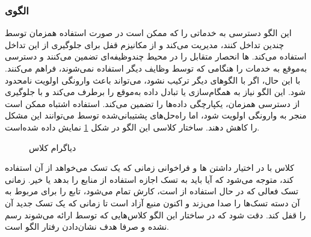 \subsubsection{الگوی }
\label{scheduleGuardedCallSec}
\begin{RTL}
این الگو \cite{ref1} دسترسی به خدماتی را که ممکن است
در صورت استفاده همزمان توسط چندین  تداخل کنند، مدیریت می‌کند و از مکانیزم قفل
برای جلوگیری از این تداخل استفاده می‌کند. ها انحصار متقابل
را در محیط چندوظیفه‌ای تضمین می‌کنند و دسترسی به‌موقع به خدمات را هنگامی
که توسط وظایف دیگر استفاده نمی‌شوند، فراهم می‌کنند. با این حال،
اگر با الگوهای دیگر ترکیب نشود، می‌تواند باعث وارونگی اولویت نامحدود شود.
این الگو نیاز به همگام‌سازی یا تبادل داده به‌موقع را برطرف می‌کند و
با جلوگیری از دسترسی همزمان، یکپارچگی داده‌ها را تضمین
می‌کند. استفاده اشتباه ممکن است منجر به وارونگی اولویت شود، اما
راه‌حل‌های پشتیبانی‌شده توسط  می‌توانند این مشکل را کاهش دهند.
ساختار کلاسی این الگو در شکل \ref{ConGuardCallClassDiag}
نمایش داده شده‌است.
\end{RTL}
\begin{figure}[h!]
\centering
{}
\caption{دیاگرام کلاس }
\label{ConGuardCallClassDiag}
\end{figure}
\begin{RTL}
کلاس  با در اختیار داشتن ها
و فراخوانی  زمانی که یک تسک می‌خواهد از آن استفاده کند،
متوجه می‌شود که آیا باید به تسک اجازه استفاده از منابع را بدهد یا خیر.
زمانی تسک فعالی که در حال استفاده از  است،
کارش تمام می‌شود،  تابع  را
برای  مربوط به آن دسته تسک‌ها را صدا می‌زند و اکنون
منبع آزاد است تا زمانی که یک تسک جدید آن را قفل کند.
دقت شود که در ساختار این الگو کلاس‌هایی که توسط  ارائه می‌شوند
رسم نشده و صرفا هدف نشان‌دادن رفتار الگو است.
\end{RTL}